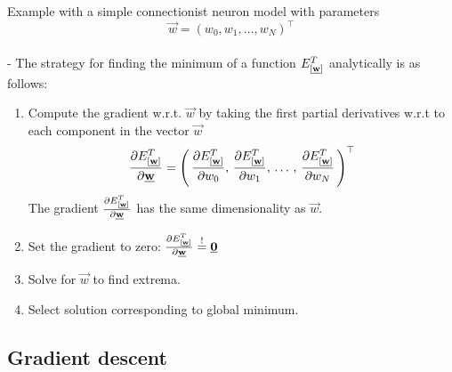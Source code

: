 \begin{frame}\frametitle{\subsecname}

    Example with a simple connectionist neuron model
    with parameters
    $$\vec w = (w_{0}, w_{1}, \ldots, w_{N})^{\top}$$\\


    - The strategy for finding the minimum of a function ${E}^T_{[\underline{\mathbf{w}}]}$ analytically is as follows:
    \begin{enumerate}
    \item Compute the gradient w.r.t. $\vec w$ by taking the first partial derivatives w.r.t to each component in the vector $\vec w$
    \begin{equation}
        \frac{\partial {E}^T_{[\underline{\mathbf{w}}]}}{\partial \underline{\mathbf{w}}} = \left(\,
        \frac{\partial {E}^T_{[\underline{\mathbf{w}}]}}{\partial w_{0}}, \,
        \frac{\partial {E}^T_{[\underline{\mathbf{w}}]}}{\partial w_{1}}, \,\ldots\,,\, 
        \frac{\partial {E}^T_{[\underline{\mathbf{w}}]}}{\partial w_{N}}\,
        \right)^{\top}
        \label{eq:gradient_partial}
    \end{equation}
    The gradient $\frac{\partial {E}^T_{[\underline{\mathbf{w}}]}}{\partial \underline{\mathbf{w}}}$ has the same dimensionality as $\vec w$.
    
    \item Set the gradient to zero: $\frac{\partial {E}^T_{[\underline{\mathbf{w}}]}}{\partial \underline{\mathbf{w}}} \stackrel{\mathrm{!}}{=} \underline{\mathbf{0}}$
    \item Solve for $\vec w$ to find extrema.
    \item Select solution corresponding to global minimum.
    
    \end{enumerate}
    
\end{frame}

\subsection{Gradient descent}

